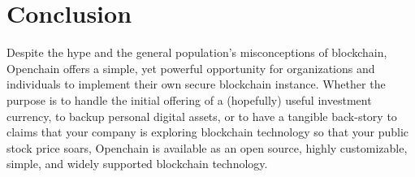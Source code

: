 \section{Conclusion}
Despite the hype and the general population's misconceptions of blockchain,
Openchain offers a simple, yet powerful opportunity for organizations and
individuals to implement their own secure blockchain instance. Whether the
purpose is to handle the initial offering of a (hopefully) useful investment
currency, to backup personal digital assets, or to have a tangible back-story
to claims that your company is exploring blockchain technology so that your
public stock price soars, Openchain is available as an open source, highly
customizable, simple, and widely supported blockchain technology.



